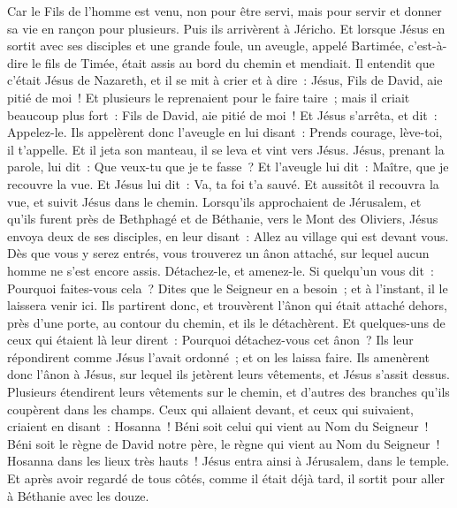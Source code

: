 \begin{multicols}{2}
Car le Fils de l'homme est venu, non pour être servi, mais pour servir et donner sa vie en rançon pour plusieurs.
Puis ils arrivèrent à Jéricho. Et lorsque Jésus en sortit avec ses disciples et une grande foule, un aveugle, appelé Bartimée, c'est-à-dire le fils de Timée, était assis au bord du chemin et mendiait.
Il entendit que c'était Jésus de Nazareth, et il se mit à crier et à dire~: Jésus, Fils de David, aie pitié de moi~!
Et plusieurs le reprenaient pour le faire taire~; mais il criait beaucoup plus fort~: Fils de David, aie pitié de moi~!
Et Jésus s'arrêta, et dit~: Appelez-le. Ils appelèrent donc l'aveugle en lui disant~: Prends courage, lève-toi, il t'appelle.
Et il jeta son manteau, il se leva et vint vers Jésus.
Jésus, prenant la parole, lui dit~: Que veux-tu que je te fasse~? Et l'aveugle lui dit~: Maître, que je recouvre la vue.
Et Jésus lui dit~: Va, ta foi t'a sauvé.
Et aussitôt il recouvra la vue, et suivit Jésus dans le chemin.
\VerseOne{}Lorsqu'ils approchaient de Jérusalem, et qu'ils furent près de Bethphagé et de Béthanie, vers le Mont des Oliviers, Jésus envoya deux de ses disciples,
en leur disant~: Allez au village qui est devant vous. Dès que vous y serez entrés, vous trouverez un ânon attaché, sur lequel aucun homme ne s'est encore assis. Détachez-le, et amenez-le.
Si quelqu'un vous dit~: Pourquoi faites-vous cela~? Dites que le Seigneur en a besoin~; et à l'instant, il le laissera venir ici.
Ils partirent donc, et trouvèrent l'ânon qui était attaché dehors, près d'une porte, au contour du chemin, et ils le détachèrent.
Et quelques-uns de ceux qui étaient là leur dirent~: Pourquoi détachez-vous cet ânon~?
Ils leur répondirent comme Jésus l'avait ordonné~; et on les laissa faire.
Ils amenèrent donc l'ânon à Jésus, sur lequel ils jetèrent leurs vêtements, et Jésus s'assit dessus.
Plusieurs étendirent leurs vêtements sur le chemin, et d'autres des branches qu'ils coupèrent dans les champs.
Ceux qui allaient devant, et ceux qui suivaient, criaient en disant~: Hosanna~! Béni soit celui qui vient au Nom du Seigneur~!
Béni soit le règne de David notre père, le règne qui vient au Nom du Seigneur~! Hosanna dans les lieux très hauts~!
Jésus entra ainsi à Jérusalem, dans le temple. Et après avoir regardé de tous côtés, comme il était déjà tard, il sortit pour aller à Béthanie avec les douze.

\end{multicols}
